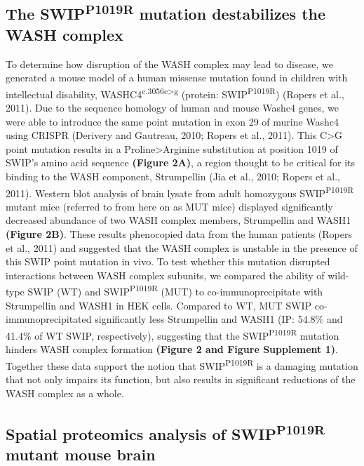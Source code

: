 \subsection{The SWIP\textsuperscript{P1019R} mutation destabilizes the WASH complex}

To determine how disruption of the WASH complex may lead to
disease, we generated a mouse model of a human missense mutation found in
children with intellectual disability, WASHC4\textsuperscript{c.3056c>g} 
(protein: SWIP\textsuperscript{P1019R}) (Ropers et al., 2011). 
Due to the sequence homology of human and mouse Washc4
genes, we were able to introduce the same point mutation in exon 29 of murine
Washc4 using CRISPR (Derivery and Gautreau, 2010; Ropers et al., 2011). This C>G
point mutation results in a Proline>Arginine substitution at position 1019 of
SWIP’s amino acid sequence \textbf{(Figure 2A)}, a region thought to be critical for its
binding to the WASH component, Strumpellin (Jia et al., 2010; Ropers et al.,
2011). Western blot analysis of brain lysate from adult homozygous SWIP\textsuperscript{P1019R}
mutant mice (referred to from here on as MUT mice) displayed significantly
decreased abundance of two WASH complex members, Strumpellin and WASH1 
\textbf{(Figure 2B)}. These results phenocopied data from the human patients (Ropers et al.,
2011) and suggested that the WASH complex is unstable in the presence of this
SWIP point mutation in vivo. To test whether this mutation disrupted
interactions between WASH complex subunits, we compared the ability of wild-type
SWIP (WT) and SWIP\textsuperscript{P1019R} (MUT) to co-immunoprecipitate with Strumpellin and
WASH1 in HEK cells. Compared to WT, MUT SWIP co-immunoprecipitated significantly
less Strumpellin and WASH1 (IP: 54.8\% and 41.4\% of WT SWIP, respectively),
suggesting that the SWIP\textsuperscript{P1019R} mutation hinders WASH complex formation 
\textbf{(Figure 2 and Figure Supplement 1)}. Together these data support the notion that 
SWIP\textsuperscript{P1019R} is a damaging mutation that not only impairs its function, 
but also results in significant reductions of the WASH complex as a whole.

\subsection{Spatial proteomics analysis of SWIP\textsuperscript{P1019R} mutant mouse brain}


